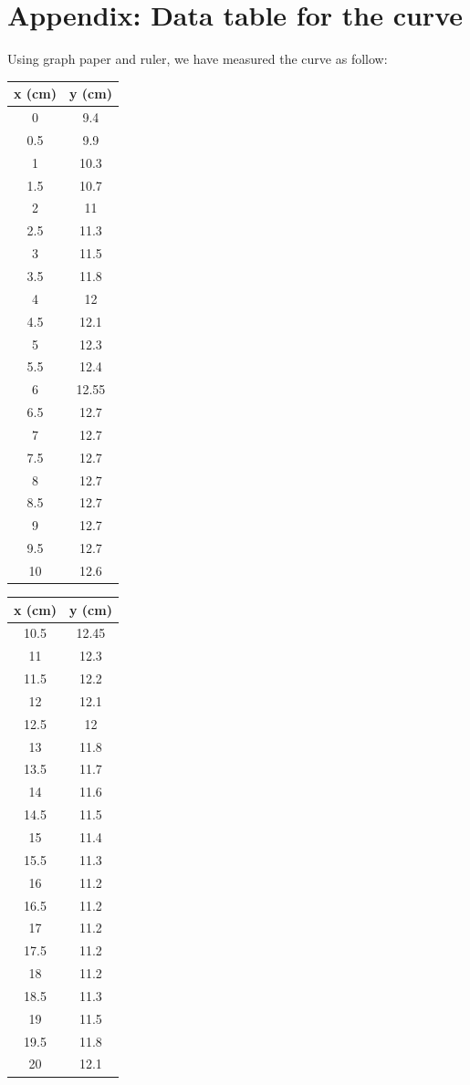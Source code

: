 \documentclass{article}
\begin{document}
\section{Appendix: Data table for the curve}
    Using graph paper and ruler, we have measured the curve as follow:
\begin{table}[ht]
\begin{minipage}[b]{0.45\linewidth}\centering
\begin{tabular}{c|c}
x (cm)	&	y (cm) \\ \hline
0	&	9.4 \\
0.5	&	9.9 \\
1	&	10.3 \\
1.5	&	10.7 \\
2	&	11 \\
2.5	&	11.3 \\
3	&	11.5 \\
3.5	&	11.8 \\
4	&	12 \\
4.5	&	12.1 \\
5	&	12.3 \\
5.5	&	12.4 \\
6	&	12.55 \\
6.5	&	12.7 \\
7	&	12.7 \\
7.5	&	12.7 \\
8	&	12.7 \\
8.5	&	12.7 \\
9	&	12.7 \\
9.5	&	12.7 \\
10	&	12.6 \\
    \end{tabular}
\end{minipage}
\hspace{0.5cm}
\begin{minipage}[b]{0.45\linewidth}
\centering
\begin{tabular}{c|c}
   x (cm)	&	y (cm) \\ \hline 
10.5	&	12.45 \\
11	&	12.3 \\
11.5	&	12.2 \\
12	&	12.1 \\
12.5	&	12 \\
13	&	11.8 \\
13.5	&	11.7 \\
14	&	11.6 \\
14.5	&	11.5 \\
15	&	11.4 \\
15.5	&	11.3 \\
16	&	11.2 \\
16.5	&	11.2 \\
17	&	11.2 \\
17.5	&	11.2 \\
18	&	11.2 \\
18.5	&	11.3 \\
19	&	11.5 \\
19.5	&	11.8 \\
20	&	12.1 \\
    \end{tabular}
\end{minipage}
\end{table}
\end{document}
